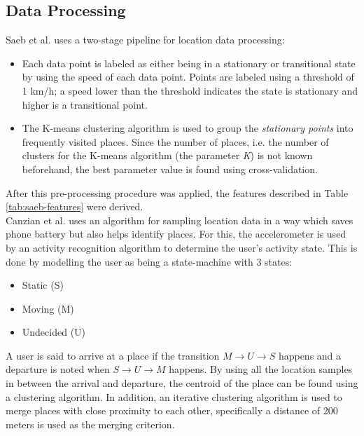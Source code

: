 \subsection{Data Processing}
Saeb et al. uses a two-stage pipeline for location data processing: 
\begin{itemize}
    \item Each data point is labeled as either being in a stationary or transitional state by using the speed of each data point. Points are labeled using a threshold of 1 km/h; a speed lower than the threshold indicates the state is stationary and higher is a transitional point. 
    \item The K-means clustering algorithm is used to group the \textit{stationary points} into frequently visited places. Since the number of places, i.e. the number of clusters for the K-means algorithm (the parameter \textit{K}) is not known beforehand, the best parameter value is found using cross-validation.
\end{itemize}

After this pre-processing procedure was applied, the features described in Table \ref{tab:saeb-features} were derived.\\ 

Canzian et al. uses an algorithm for sampling location data in a way which saves phone battery but also helps identify places. For this, the accelerometer is used by an activity recognition algorithm to determine the user's activity state. This is done by modelling the user as being a state-machine with 3 states: 
\begin{itemize}
    \item Static (S)
    \item Moving (M)
    \item Undecided (U)
\end{itemize}

A user is said to arrive at a place if the transition $M \rightarrow U \rightarrow S$ happens and a departure is noted when $S \rightarrow U \rightarrow M$ happens. By using all the location samples in between the arrival and departure, the centroid of the place can be found using a clustering algorithm. In addition, an iterative clustering algorithm is used to merge places with close proximity to each other, specifically a distance of 200 meters is used as the merging criterion. \\ 


